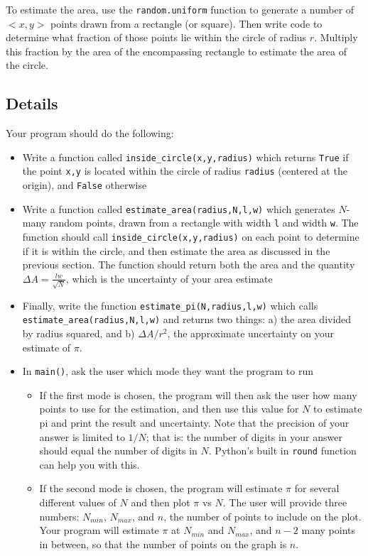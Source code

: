 \documentclass{article}
\begin{document}
To estimate the area, use the \texttt{random.uniform} function to generate a number of $<x,y>$ points drawn from a rectangle (or square). Then write code to determine what fraction of those points lie within the circle of radius $r$. Multiply this fraction by the area of the encompassing rectangle to estimate the area of the circle.
\subsection*{Details}
Your program should do the following:
\begin{itemize}
	\item Write a function called \texttt{inside\_circle(x,y,radius)} which returns \texttt{True} if the point \texttt{x,y} is located within the circle of radius \texttt{radius} (centered at the origin), and \texttt{False} otherwise
	\item Write a function called \texttt{estimate\_area(radius,N,l,w)} which generates $N$-many random points, drawn from a rectangle with width \texttt{l} and width \texttt{w}. The function should call \texttt{inside\_circle(x,y,radius)} on each point to determine if it is within the circle, and then estimate the area as discussed in the previous section. The function should return both the area and the quantity $\Delta A=\frac{lw}{\sqrt{N}}$, which is the uncertainty of your area estimate
	\item Finally, write the function \texttt{estimate\_pi(N,radius,l,w)} which calls \texttt{estimate\_area(radius,N,l,w)} and returns two things: a) the area divided by radius squared, and b) $\Delta A / r^2$, the approximate uncertainty on your estimate of $\pi$.
	\item In \texttt{main()}, ask the user which mode they want the program to run
	\begin{itemize}
		\item If the first mode is chosen, the program will then ask the user how many points to use for the estimation, and then use this value for $N$ to estimate pi and print the result and uncertainty. Note that the precision of your answer is limited to $1/N$; that is: the number of digits in your answer should equal the number of digits in $N$. Python's built in \texttt{round} function can help you with this.
		\item If the second mode is chosen, the program will estimate $\pi$ for several different values of $N$ and then plot $\pi$ vs $N$. The user will provide three numbers: $N_{min}$, $N_{max}$, and $n$, the number of points to include on the plot. Your program will estimate $\pi$ at $N_{min}$ and $N_{max}$, and $n-2$ many points in between, so that the number of points on the graph is $n$.
	\end{itemize}
\end{itemize}
\end{document}
